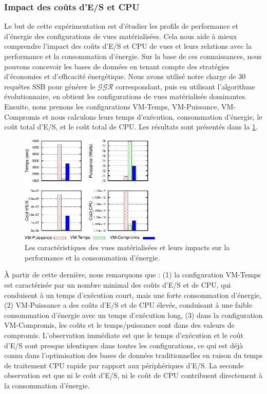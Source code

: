 \subsubsection{Impact des coûts d'E/S et CPU}\label{subsubsec:ImpactIOCPUCosts}
Le but de cette expérimentation est d'étudier les profils de performance et d'énergie des configurations de vues matérialisées. Cela nous aide à mieux comprendre l'impact des coûts d'E/S et CPU de vues et leurs relations avec la performance et la consommation d'énergie. Sur la base de ces connaissances, nous pouvons concevoir les bases de données en tenant compte des stratégies d'économies et d'efficacité énergétique.
Nous avons utilisé notre charge de 30 requêtes SSB pour générer le $\mathcal{GGR}$ correspondant, puis en utilisant l'algorithme évolutionnaire, en obtient les configurations de vues matérialisée dominantes. Ensuite, nous prenons les configurations VM-Temps, VM-Puissance, VM-Compromis et nous calculons leurs temps d'exécution, consommation d'énergie, le coût total d'E/S, et le coût total de CPU. Les résultats sont présentés dans la \ref{fig:power-time-io-cpu-histo}.
\begin{figure}
  \centering
  \includegraphics[width=0.6\textwidth]{chapitre6/chap6Fig/power-time-io-cpu-histo.eps}
  \caption{Les caractéristiques des vues matérialisées et leurs impacts sur la performance et la consommation d'énergie.}\label{fig:power-time-io-cpu-histo}
\end{figure}
À partir de cette dernière, nous remarquons que : (1) la configuration VM-Temps est caractérisée par un nombre minimal des coûts d'E/S et de CPU, qui conduisent à un temps d'exécution court, mais une forte consommation d'énergie, (2) VM-Puissance a des coûts d'E/S et de CPU élevés, conduisant à une faible consommation d'énergie avec un temps d'exécution long, (3) dans la configuration VM-Compromis, les coûts et le temps/puissance sont dans des valeurs de compromis.
L'observation immédiate est que le temps d'exécution et le coût d'E/S sont presque identiques dans toutes les configurations, ce qui est déjà connu dans l'optimisation des bases de données traditionnelles en raison du temps de traitement CPU rapide par rapport aux périphériques d'E/S. La seconde observation est que ni le coût d'E/S, ni le coût de CPU contribuent directement à la consommation d'énergie.
